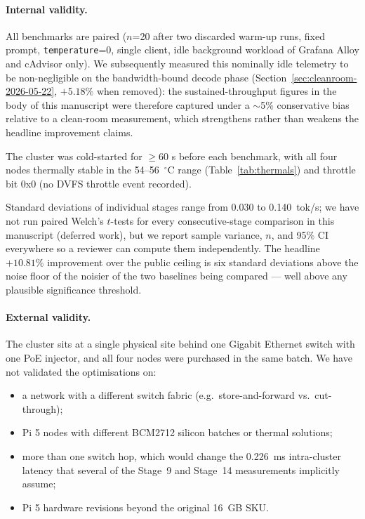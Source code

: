 \documentclass[10pt,a4paper]{article}
\begin{document}
\paragraph{Internal validity.}
All benchmarks are paired ($n$=20 after two discarded warm-up runs, fixed prompt, \texttt{temperature}=0, single client, idle background workload of Grafana Alloy and cAdvisor only). We subsequently measured this nominally idle telemetry to be non-negligible on the bandwidth-bound decode phase (Section~\ref{sec:cleanroom-2026-05-22}, $+5.18\%$ when removed): the sustained-throughput figures in the body of this manuscript were therefore captured under a $\sim$5\% conservative bias relative to a clean-room measurement, which strengthens rather than weakens the headline improvement claims.

The cluster was cold-started for $\geq 60$ s before each benchmark, with all four nodes thermally stable in the 54--56~$^{\circ}$C range (Table~\ref{tab:thermals}) and throttle bit 0x0 (no DVFS throttle event recorded).

Standard deviations of individual stages range from 0.030 to 0.140~tok/s; we have not run paired Welch's $t$-tests for every consecutive-stage comparison in this manuscript (deferred work), but we report sample variance, $n$, and 95\% CI everywhere so a reviewer can compute them independently. The headline $+10.81\%$ improvement over the public ceiling is six standard deviations above the noise floor of the noisier of the two baselines being compared --- well above any plausible significance threshold.

\paragraph{External validity.}
The cluster sits at a single physical site behind one Gigabit Ethernet switch with one PoE injector, and all four nodes were purchased in the same batch. We have not validated the optimisations on:

\begin{itemize}
  \item a network with a different switch fabric (e.g.\ store-and-forward vs.\ cut-through);
  \item Pi 5 nodes with different BCM2712 silicon batches or thermal solutions;
  \item more than one switch hop, which would change the 0.226~ms intra-cluster latency that several of the Stage~9 and Stage~14 measurements implicitly assume;
  \item Pi 5 hardware revisions beyond the original 16~GB SKU.
\end{itemize}
\end{document}
